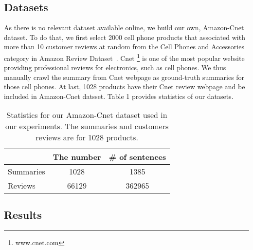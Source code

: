 \documentclass[letterpaper]{article}
\begin{document}
\subsection{Datasets}
As there is no relevant dataset available online, we build our own, Amazon-Cnet dataset. To do that, we first select 2000 cell phone products that associated with more than 10 customer reviews at random from the Cell Phones and Accessories category in Amazon Review Dataset~\cite{He2016Ups}. Cnet \footnote[1]{www.cnet.com} is one of the most popular website providing professional reviews for electronics, such as cell phones. We thus manually crawl the summary from Cnet webpage as ground-truth summaries for those cell phones. At last, 1028 products have their Cnet review webpage and be included in Amazon-Cnet datsset. Table 1 provides statistics of our datasets.

\begin{table}[htbp]
\centering
\caption{Statistics for our Amazon-Cnet dataset used in our experiments. The summaries and customers reviews are for 1028 products.}
\label{table_dataset}
\begin{tabular}{l | c | c } 
\toprule
\textbf{}   & \textbf{The number} & \textbf{\# of sentences} \\
\midrule
Summaries  & 1028   & 1385\\
Reviews & 66129 &  362965 \\
\bottomrule
\end{tabular}
\end{table}


\subsection{Results}
\end{document}
